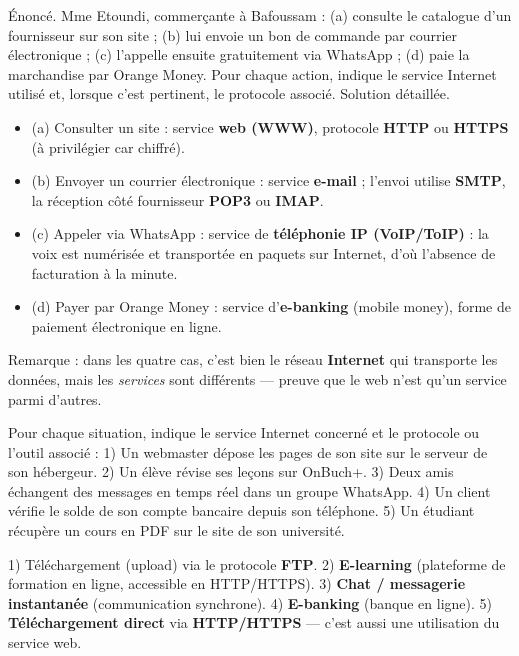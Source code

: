 \documentclass[11pt]{article}
\begin{document}
\begin{exoresolu}
Énoncé. Mme Etoundi, commerçante à Bafoussam : (a) consulte le catalogue d'un fournisseur sur son site ; (b) lui envoie un bon de commande par courrier électronique ; (c) l'appelle ensuite gratuitement via WhatsApp ; (d) paie la marchandise par Orange Money. Pour chaque action, indique le service Internet utilisé et, lorsque c'est pertinent, le protocole associé.
\tcblower
Solution détaillée.
\begin{itemize}
  \item (a) Consulter un site : service \textbf{web (WWW)}, protocole \textbf{HTTP} ou \textbf{HTTPS} (à privilégier car chiffré).
  \item (b) Envoyer un courrier électronique : service \textbf{e-mail} ; l'envoi utilise \textbf{SMTP}, la réception côté fournisseur \textbf{POP3} ou \textbf{IMAP}.
  \item (c) Appeler via WhatsApp : service de \textbf{téléphonie IP (VoIP/ToIP)} : la voix est numérisée et transportée en paquets sur Internet, d'où l'absence de facturation à la minute.
  \item (d) Payer par Orange Money : service d'\textbf{e-banking} (mobile money), forme de paiement électronique en ligne.
\end{itemize}
Remarque : dans les quatre cas, c'est bien le réseau \textbf{Internet} qui transporte les données, mais les \emph{services} sont différents — preuve que le web n'est qu'un service parmi d'autres.
\end{exoresolu}

\begin{exercice}
Pour chaque situation, indique le service Internet concerné et le protocole ou l'outil associé : 1) Un webmaster dépose les pages de son site sur le serveur de son hébergeur. 2) Un élève révise ses leçons sur OnBuch+. 3) Deux amis échangent des messages en temps réel dans un groupe WhatsApp. 4) Un client vérifie le solde de son compte bancaire depuis son téléphone. 5) Un étudiant récupère un cours en PDF sur le site de son université.
\end{exercice}

\begin{corrige}
1) Téléchargement (upload) via le protocole \textbf{FTP}. 2) \textbf{E-learning} (plateforme de formation en ligne, accessible en HTTP/HTTPS). 3) \textbf{Chat / messagerie instantanée} (communication synchrone). 4) \textbf{E-banking} (banque en ligne). 5) \textbf{Téléchargement direct} via \textbf{HTTP/HTTPS} — c'est aussi une utilisation du service web.
\end{corrige}
\end{document}
